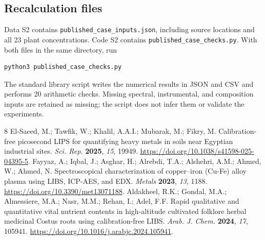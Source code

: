 \documentclass[11pt]{article}
\begin{document}
\subsection{Recalculation files}\label{sec:published-recalculation}
Data S2 contains \texttt{published\_case\_inputs.json}, including source locations and all 23 plant concentrations. Code S2 contains \texttt{published\_case\_checks.py}. With both files in the same directory, run
\begin{verbatim}
python3 published_case_checks.py
\end{verbatim}
The standard library script writes the numerical results in JSON and CSV and performs 20 arithmetic checks. Missing spectral, instrumental, and composition inputs are retained as missing; the script does not infer them or validate the experiments.

\begin{thebibliography}{8}
\setcounter{enumiv}{5}
El-Saeed, M.; Tawfik, W.; Khalil, A.A.I.; Mubarak, M.; Fikry, M.
Calibration-free picosecond LIPS for quantifying heavy metals in soils near Egyptian industrial sites.
\textit{Sci. Rep.} \textbf{2025}, \textit{15}, 19949.
\url{https://doi.org/10.1038/s41598-025-04395-5}.
Fayyaz, A.; Iqbal, J.; Asghar, H.; Alrebdi, T.A.; Alshehri, A.M.; Ahmed, W.; Ahmed, N.
Spectroscopical characterization of copper--iron (Cu-Fe) alloy plasma using LIBS, ICP-AES, and EDX.
\textit{Metals} \textbf{2023}, \textit{13}, 1188.
\url{https://doi.org/10.3390/met13071188}.
Aldakheel, R.K.; Gondal, M.A.; Almessiere, M.A.; Nasr, M.M.; Rehan, I.; Adel, F.F.
Rapid qualitative and quantitative vital nutrient contents in high-altitude cultivated folklore herbal medicinal Costus roots using calibration-free LIBS.
\textit{Arab. J. Chem.} \textbf{2024}, \textit{17}, 105941.
\url{https://doi.org/10.1016/j.arabjc.2024.105941}.
\end{thebibliography}
\end{document}
